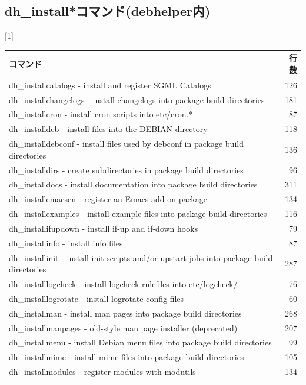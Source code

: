 \documentclass[mingoth,a4paper]{jsarticle}
\begin{document}
\subsection{dh\_install*コマンド(debhelper内)}
{\small
\begin{table}[htb]
\scalebox{1}[1]{
\begin{tabular}{|l|r|} \hline
コマンド & 行数 \\ \hline
dh\_installcatalogs - install and register SGML Catalogs & 126 \\ \hline
dh\_installchangelogs - install changelogs into package build directories & 181 \\ \hline
dh\_installcron - install cron scripts into etc/cron.* & 87 \\ \hline
dh\_installdeb - install files into the DEBIAN directory & 118 \\ \hline
dh\_installdebconf - install files used by debconf in package build directories & 136 \\ \hline
dh\_installdirs - create subdirectories in package build directories & 96 \\ \hline
dh\_installdocs - install documentation into package build directories & 311 \\ \hline
dh\_installemacsen - register an Emacs add on package & 134 \\ \hline
dh\_installexamples - install example files into package build directories & 116 \\ \hline
dh\_installifupdown - install if-up and if-down hooks & 79 \\ \hline
dh\_installinfo - install info files & 87 \\ \hline
dh\_installinit - install init scripts and/or upstart jobs into package build directories & 287 \\ \hline
dh\_installlogcheck - install logcheck rulefiles into etc/logcheck/ & 76 \\ \hline
dh\_installlogrotate - install logrotate config files & 60 \\ \hline
dh\_installman - install man pages into package build directories & 268 \\ \hline
dh\_installmanpages - old-style man page installer (deprecated) & 207 \\ \hline
dh\_installmenu - install Debian menu files into package build directories & 99 \\ \hline
dh\_installmime - install mime files into package build directories & 105 \\ \hline
dh\_installmodules - register modules with modutils & 134 \\ \hline

\end{tabular}}
\end{table}}
\end{document}
